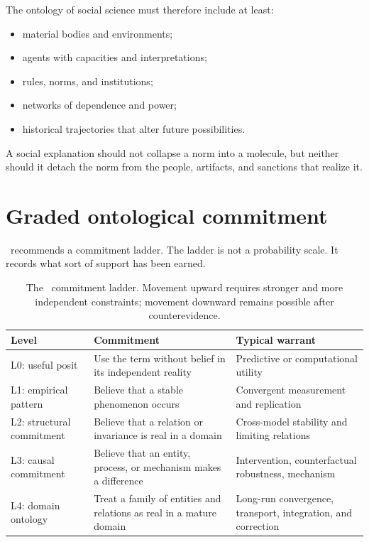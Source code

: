 The ontology of social science must therefore include at least:

\begin{itemize}
\item material bodies and environments;
\item agents with capacities and interpretations;
\item rules, norms, and institutions;
\item networks of dependence and power;
\item historical trajectories that alter future possibilities.
\end{itemize}

A social explanation should not collapse a norm into a molecule, but neither
should it detach the norm from the people, artifacts, and sanctions that
realize it.

\section{Graded ontological commitment}

\RCR\ recommends a commitment ladder. The ladder is not a probability scale.
It records what sort of support has been earned.

\begin{table}[ht]
\centering
\smalltable
\begin{tabularx}{\textwidth}{p{}Y Y}
\toprule
Level & Commitment & Typical warrant\\
\midrule
L0: useful posit & Use the term without belief in its independent reality & Predictive or computational utility\\
L1: empirical pattern & Believe that a stable phenomenon occurs & Convergent measurement and replication\\
L2: structural commitment & Believe that a relation or invariance is real in a domain & Cross-model stability and limiting relations\\
L3: causal commitment & Believe that an entity, process, or mechanism makes a difference & Intervention, counterfactual robustness, mechanism\\
L4: domain ontology & Treat a family of entities and relations as real in a mature domain & Long-run convergence, transport, integration, and correction\\
\bottomrule
\end{tabularx}
\caption{The \RCR\ commitment ladder. Movement upward requires stronger and
more independent constraints; movement downward remains possible after
counterevidence.}
\label{tab:commitment-ladder}
\end{table}

